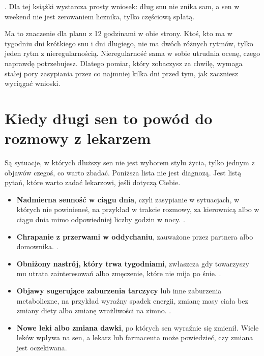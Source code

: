 . Dla tej książki wystarcza prosty wniosek: dług snu nie znika sam, a sen w weekend nie jest zerowaniem licznika, tylko częściową spłatą.

Ma to znaczenie dla planu z 12 godzinami w obie strony. Ktoś, kto ma w tygodniu dni krótkiego snu i dni długiego, nie ma dwóch różnych rytmów, tylko jeden rytm z nieregularnością. Nieregularność sama w sobie utrudnia ocenę, czego naprawdę potrzebujesz. Dlatego pomiar, który zobaczysz za chwilę, wymaga stałej pory zasypiania przez co najmniej kilka dni przed tym, jak zaczniesz wyciągać wnioski.

\section{Kiedy długi sen to powód do rozmowy z lekarzem}

Są sytuacje, w których dłuższy sen nie jest wyborem stylu życia, tylko jednym z objawów czegoś, co warto zbadać. Poniższa lista nie jest diagnozą. Jest listą pytań, które warto zadać lekarzowi, jeśli dotyczą Ciebie.

\begin{itemize}
  \item \textbf{Nadmierna senność w ciągu dnia}, czyli zasypianie w sytuacjach, w których nie powinieneś, na przykład w trakcie rozmowy, za kierownicą albo w ciągu dnia mimo odpowiedniej liczby godzin w nocy. .
  \item \textbf{Chrapanie z przerwami w oddychaniu}, zauważone przez partnera albo domownika. .
  \item \textbf{Obniżony nastrój, który trwa tygodniami}, zwłaszcza gdy towarzyszy mu utrata zainteresowań albo zmęczenie, które nie mija po śnie. .
  \item \textbf{Objawy sugerujące zaburzenia tarczycy} lub inne zaburzenia metaboliczne, na przykład wyraźny spadek energii, zmianę masy ciała bez zmiany diety albo zmianę wrażliwości na zimno. .
  \item \textbf{Nowe leki albo zmiana dawki}, po których sen wyraźnie się zmienił. Wiele leków wpływa na sen, a lekarz lub farmaceuta może powiedzieć, czy zmiana jest oczekiwana.
\end{itemize}

